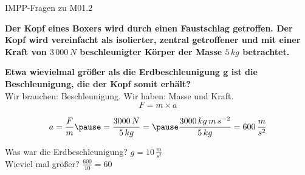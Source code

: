 \documentclass{beamer}
\begin{document}
\begin{frame}{IMPP-Fragen zu M01.2}
    
    \textbf{Der Kopf eines Boxers wird durch einen Faustschlag getroffen. Der Kopf wird vereinfacht als isolierter, zentral getroffener und mit einer Kraft von \(3\,000\,N\) beschleunigter Körper der Masse \(5\,kg\) betrachtet.}
    
        \textbf{Etwa wievielmal größer als die Erdbeschleunigung g ist die Beschleunigung, die der Kopf somit erhält?    } \\[0.2cm]


Wir brauchen:  Beschleunigung. \pause Wir haben:  Masse und Kraft. \\

\pause
\[
F = m\times a
\]

\[
a = \frac{F}{m} \pause   = \frac{3000\,N}{5\,kg} = \pause \frac{3000\,kg\, m\, s^{-2}}{5\,kg} = 600\,\frac{m}{s^2}
  \]
  
  \pause
   
  Was war die Erdbeschleunigung? \pause \(g= 10\,\frac{m}{s^2}\)  \\
  \pause
  Wieviel mal größer?  \(\frac{600}{10} = 60\)
 

\end{frame}
\end{document}
